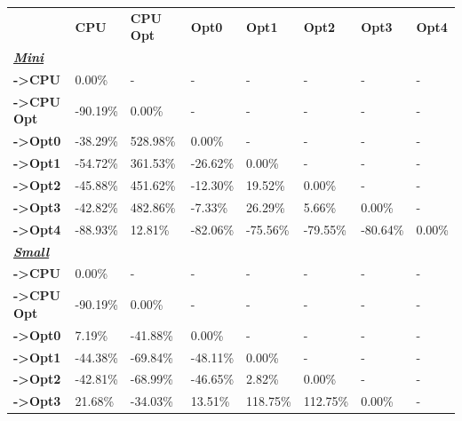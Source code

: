 \begin{table}[H]
    \centering
    \begin{tabular}{llllllll}
    \rowcolor[HTML]{DAE8FC} \ &  \textbf{CPU} &  \textbf{CPU Opt} &  \textbf{Opt0} &  \textbf{Opt1} &  \textbf{Opt2} &  \textbf{Opt3} &  \textbf{Opt4} \\
    \cellcolor[HTML]{DAE8FC} \textbf{\textbf{{\emph{{\underline{{Mini}}}}}}} &  &  &  &  &  &  &  \\
    \rowcolor[HTML]{EFEFEF} \cellcolor[HTML]{DAE8FC} \textbf{->CPU} & 0.00\% & - & - & - & - & - & - \\
    \cellcolor[HTML]{DAE8FC} \textbf{->CPU Opt} & -90.19\% & 0.00\% & - & - & - & - & - \\
    \rowcolor[HTML]{EFEFEF} \cellcolor[HTML]{DAE8FC} \textbf{->Opt0} & -38.29\% & 528.98\% & 0.00\% & - & - & - & - \\
    \cellcolor[HTML]{DAE8FC} \textbf{->Opt1} & -54.72\% & 361.53\% & -26.62\% & 0.00\% & - & - & - \\
    \rowcolor[HTML]{EFEFEF} \cellcolor[HTML]{DAE8FC} \textbf{->Opt2} & -45.88\% & 451.62\% & -12.30\% & 19.52\% & 0.00\% & - & - \\
    \cellcolor[HTML]{DAE8FC} \textbf{->Opt3} & -42.82\% & 482.86\% & -7.33\% & 26.29\% & 5.66\% & 	0.00\% & - \\
    \rowcolor[HTML]{EFEFEF} \cellcolor[HTML]{DAE8FC} \textbf{->Opt4} & -88.93\% & 12.81\% & -82.06\% & -75.56\% & -79.55\% & 	-80.64\% & 	0.00\% \\
    \cellcolor[HTML]{DAE8FC} \textbf{\textbf{{\emph{{\underline{{Small}}}}}}} &  &  &  &  &  &  &  \\
    \rowcolor[HTML]{EFEFEF} \cellcolor[HTML]{DAE8FC} \textbf{->CPU} & 0.00\% & - & - & - & - & - & - \\
    \cellcolor[HTML]{DAE8FC} \textbf{->CPU Opt} & -90.19\% & 0.00\% & - & - & - & - & - \\
    \rowcolor[HTML]{EFEFEF} \cellcolor[HTML]{DAE8FC} \textbf{->Opt0} & 7.19\% & -41.88\% & 0.00\% & - & - & - & - \\
    \cellcolor[HTML]{DAE8FC} \textbf{->Opt1} & -44.38\% & -69.84\% & -48.11\% & 0.00\% & - & - & - \\
    \rowcolor[HTML]{EFEFEF} \cellcolor[HTML]{DAE8FC} \textbf{->Opt2} & -42.81\% & -68.99\% & -46.65\% & 2.82\% & 0.00\% & - & - \\
    \cellcolor[HTML]{DAE8FC} \textbf{->Opt3} & 21.68\% & -34.03\% & 13.51\% & 118.75\% & 112.75\% & 	0.00\% & - \\

\end{tabular}
\end{table}
